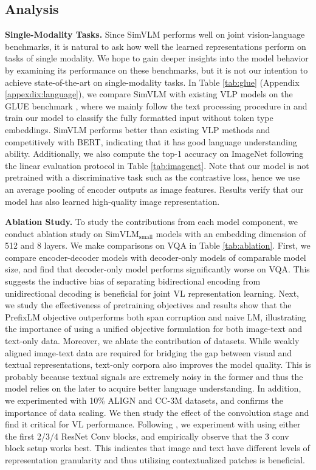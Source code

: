 \subsection{Analysis}
\label{sec:ablation}

\textbf{Single-Modality Tasks.} Since {SimVLM} performs well on joint vision-language benchmarks, it is natural to ask how well the learned representations perform on tasks of single modality. We hope to gain deeper insights into the model behavior by examining its performance on these benchmarks, but it is not our intention to achieve state-of-the-art on single-modality tasks. In Table \ref{tab:glue} (Appendix \ref{appexdix:language}),
we compare {SimVLM} with existing VLP models on the GLUE benchmark \citep{wang2018glue}, where we mainly follow the text processing procedure in \cite{raffel2019exploring} and train our model to classify the fully formatted input without token type embeddings. {SimVLM} performs better than existing VLP methods and competitively with BERT, indicating that it has good language understanding ability. Additionally, we also compute the top-1 accuracy on ImageNet following the linear evaluation protocol in Table \ref{tab:imagenet}. Note that our model is not pretrained with a discriminative task such as the contrastive loss, hence we use an average pooling of encoder outputs as image features. Results verify that our model has also learned high-quality image representation.

\textbf{Ablation Study.} To study the contributions from each model component, we conduct ablation study on $\text{SimVLM}_{\text{small}}$ models with an embedding dimension of 512 and 8 layers. We make comparisons on VQA in Table \ref{tab:ablation}. 
First, we compare encoder-decoder models with decoder-only models of comparable model size, and find that decoder-only model performs significantly worse on VQA. This suggests the inductive bias of separating bidirectional encoding from unidirectional decoding is beneficial for joint VL representation learning. Next, we study the effectiveness of pretraining objectives and results show that the PrefixLM objective outperforms both span corruption \citep{raffel2019exploring} and naive LM, illustrating the importance of using a unified objective formulation for both image-text and text-only data. Moreover, we ablate the contribution of datasets. While weakly aligned image-text data are required for bridging the gap between visual and textual representations, text-only corpora also improves the model quality. This is probably because textual signals are extremely noisy in the former and thus the model relies on the later to acquire better language understanding. In addition, we experimented with 10\% ALIGN and CC-3M \citep{sharma-etal-2018-conceptual} datasets, and confirms the importance of data scaling. We then study the effect of the convolution stage and find it critical for VL performance. Following \cite{dai2021coatnet}, we experiment with using either the first 2/3/4 ResNet Conv blocks, and empirically observe that the 3 conv block setup works best. This indicates that image and text have different levels of representation granularity and thus utilizing contextualized patches is beneficial.

